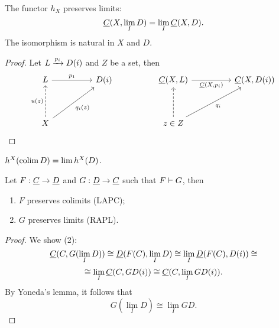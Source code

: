\begin{theorem*}
	The functor \( h_X \) preserves limits:
	\[
		\underline{C}(X, \lim_I D) = \lim_I \underline{C}(X, D).
	\]
	The isomorphism is natural in \( X \) and \( D \).
\end{theorem*}
\begin{proof}
	Let \( L \xrightarrow{p_i} D(i) \) and \( Z \) be a set, then
	\[
		\begin{tikzcd}
			L && {D(i)} && {\C(X, L)} && {\C(X, D(i))} \\
			\\
			X &&&& {z \in Z}
			\arrow["{p_1}", from=1-1, to=1-3]
			\arrow["{\C(X, p_i)}"', from=1-5, to=1-7]
			\arrow["{u(z)}", dashed, from=3-1, to=1-1]
			\arrow["{q_i(z)}"', from=3-1, to=1-3]
			\arrow[dashed, from=3-5, to=1-5]
			\arrow["{q_i}"', from=3-5, to=1-7]
		\end{tikzcd}
	\]
\end{proof}

\begin{corollary*}
	\( h^X(\operatorname{colim} D) = \lim h^X(D) \).
\end{corollary*}

\begin{corollary*}
	Let \( F: \underline{C} \to \underline{D} \) and \( G: \underline{D} \to \underline{C} \) such that \( F \mathrel{\vdash} G \), then
	\begin{enumerate}
		\item \( F \) preserves colimits (LAPC);
		\item \( G \) preserves limits (RAPL).
	\end{enumerate}
\end{corollary*}
\begin{proof}
	We show (2):
	\[
		\underline{C}(C, G(\lim_I D)) \cong \underline{D}(F(C), \lim_I D) \cong \lim_I \underline{D}(F(C), D(i)) \cong
	\]
	\[
		\cong \lim_I \underline{C}(C, GD(i)) \cong \underline{C}(C, \lim_I GD(i)).
	\]
	By Yoneda's lemma, it follows that
	\[
		G(\lim_I D) \cong \lim_I GD.
	\]
\end{proof}

